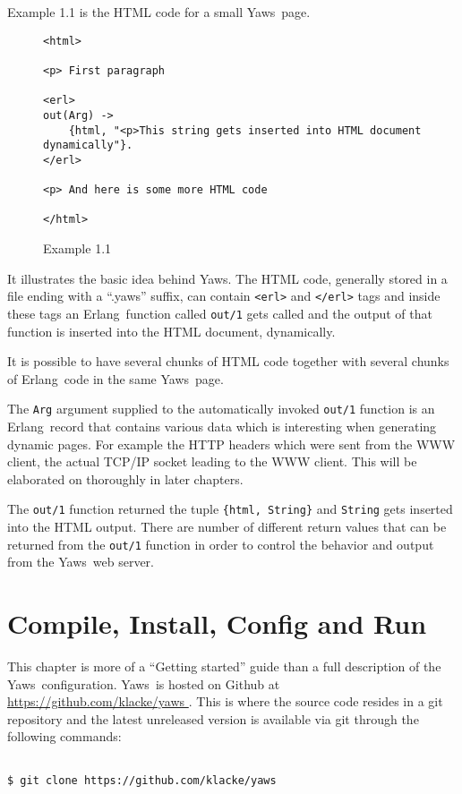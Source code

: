 \documentclass[11pt,oneside,english]{book}
\newcommand{\Erlang}            %
        {{\sc Erlang}}
\newcommand{\Yaws}            %
        {{\sc Yaws}}
\begin{document}
Example 1.1 is the HTML code for a small \Yaws\  page.


\begin{figure}[h]
\begin{verbatim}
<html>

<p> First paragraph

<erl>
out(Arg) ->
    {html, "<p>This string gets inserted into HTML document dynamically"}.
</erl>

<p> And here is some more HTML code

</html>
\end{verbatim}
\caption{Example 1.1}
\end{figure}

It illustrates the basic idea behind \Yaws{}. The HTML code, generally
stored in a file ending with a ``.yaws'' suffix, can contain
\verb+<erl>+ and \verb+</erl>+ tags and inside these tags an
\Erlang\ function called \verb+out/1+ gets called and the output of
that function is inserted into the HTML document, dynamically.

It is possible to have several chunks of HTML code together with several
chunks of \Erlang\  code in the same \Yaws\  page.

The \verb+Arg+ argument supplied to the automatically invoked \verb+out/1+
function is an \Erlang\  record that contains various data which is interesting
when generating dynamic pages. For example the HTTP headers which were sent
from the WWW client, the actual TCP/IP socket leading to the WWW client.
This will be elaborated on thoroughly in later chapters.

The \verb+out/1+ function returned the tuple \verb+{html, String}+ and
\verb+String+ gets inserted into the HTML output. There are number
of different return values that can be returned from the \verb+out/1+ function
in order to control the behavior and output from the \Yaws\  web server.


\chapter{Compile, Install, Config and Run}

This chapter is more of a ``Getting started'' guide than a full
description of the \Yaws\ configuration.  \Yaws\ is hosted on Github
at \url{ https://github.com/klacke/yaws }. This is where the source
code resides in a git repository and the latest unreleased version is
available via git through the following commands:

\begin{verbatim}

$ git clone https://github.com/klacke/yaws

\end{verbatim}
\end{document}
